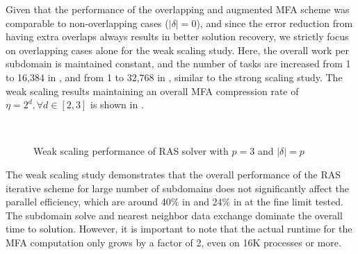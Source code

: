 Given that the performance of the overlapping and augmented MFA scheme was comparable to non-overlapping cases ($\left| \delta \right|=0$), and since the error reduction from having extra overlaps always results in better solution recovery, we strictly focus on overlapping cases alone for the weak scaling study. Here, the overall work per subdomain is maintained constant, and the number of tasks are increased from 1 to 16,384 in , and from 1 to 32,768 in , similar to the strong scaling study.
The weak scaling results maintaining an overall MFA compression rate of $\eta=2^d,\forall d \in [2,3]$ is shown in .


\begin{figure}[htbp]
	\centering
	\hfill
	\\
	\caption{Weak scaling performance of RAS solver with $p=3$ and $\left| \delta \right|=p$}
	\label{fig:weak-scaling}
\end{figure}

The weak scaling study demonstrates that the overall performance of the RAS iterative scheme for large number of subdomains does not significantly affect the parallel efficiency, which are around 40\% in  and 24\% in  at the fine limit tested. The subdomain solve and nearest neighbor data exchange dominate the overall time to solution. However, it is important to note that the actual runtime for the MFA computation only grows by a factor of 2, even on 16K processes or more. 


